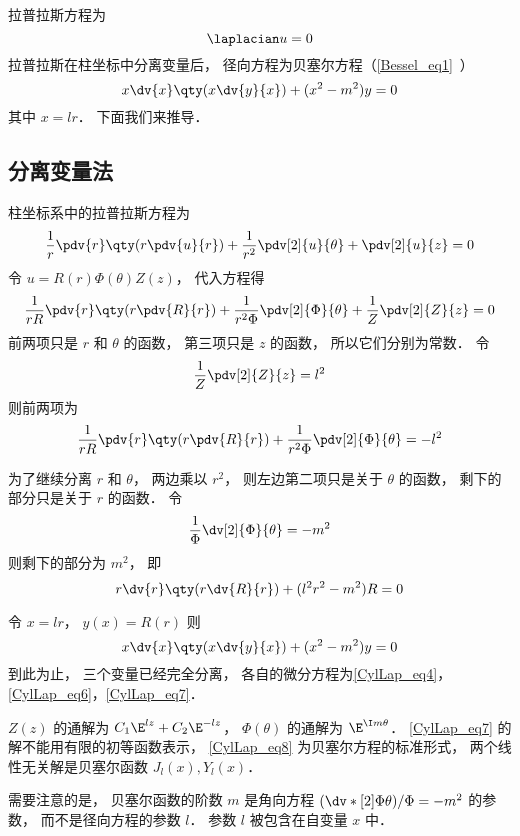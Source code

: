 

拉普拉斯方程为
\begin{equation}
\laplacian u = 0
\end{equation}
拉普拉斯在柱坐标中分离变量后， 径向方程为贝塞尔方程（\autoref{Bessel_eq1}~）
\begin{equation}
x \dv{x} \qty(x \dv{y}{x}) + (x^2 - m^2)y = 0
\end{equation}
其中 $x = lr$． 下面我们来推导．

\subsection{分离变量法}
柱坐标系中的拉普拉斯方程为
\begin{equation}
\frac{1}{r} \pdv{r} \qty(r\pdv{u}{r}) + \frac{1}{r^2} \pdv[2]{u}{\theta} + \pdv[2]{u}{z} = 0
\end{equation}
令 $u = R(r) \Phi(\theta) Z(z)$， 代入方程得
\begin{equation}
\frac{1}{rR}\pdv{r} \qty(r\pdv{R}{r}) + \frac{1}{r^2 \Phi} \pdv[2]{\Phi}{\theta} + \frac{1}{Z} \pdv[2]{Z}{z} = 0
\end{equation}
前两项只是 $r$ 和 $\theta $ 的函数， 第三项只是 $z$ 的函数， 所以它们分别为常数． 令
\begin{equation}\label{CylLap_eq4}
\frac{1}{Z} \pdv[2]{Z}{z} = l^2
\end{equation}
则前两项为
\begin{equation}
\frac{1}{rR} \pdv{r} \qty(r\pdv{R}{r}) + \frac{1}{r^2 \Phi} \pdv[2]{\Phi}{\theta} =  - l^2
\end{equation}

为了继续分离 $r$ 和 $\theta$， 两边乘以 $r^2$，   则左边第二项只是关于 $\theta$  的函数， 剩下的部分只是关于 $r$ 的函数． 令
\begin{equation}\label{CylLap_eq6}
\frac{1}{\Phi } \dv[2]{\Phi}{\theta} = -m^2
\end{equation}
则剩下的部分为 $m^2$， 即
\begin{equation}\label{CylLap_eq7}
r \dv{r} \qty(r\dv{R}{r}) + (l^2 r^2 - m^2)R = 0
\end{equation}

令 $x = lr$，   $y(x) = R(r)$ 则
\begin{equation}\label{CylLap_eq8} 
x \dv{x} \qty(x\dv{y}{x}) + (x^2 - m^2)y = 0
\end{equation}
到此为止， 三个变量已经完全分离， 各自的微分方程为\autoref{CylLap_eq4}， \autoref{CylLap_eq6}，\autoref{CylLap_eq7}．

$Z(z)$ 的通解为 $C_1\E^{lz} + C_2 \E^{-lz}$，   $\Phi(\theta)$ 的通解为 $\E^{\I m\theta}$．   \autoref{CylLap_eq7} 的解不能用有限的初等函数表示， \autoref{CylLap_eq8} 为贝塞尔方程的标准形式， 两个线性无关解是贝塞尔函数 $J_l(x), Y_l(x)$．

需要注意的是， 贝塞尔函数的阶数 $m$ 是角向方程 $(\dv*[2]{\Phi}{\theta})/\Phi = -m^2$ 的参数， 而不是径向方程的参数 $l$． 参数 $l$ 被包含在自变量 $x$ 中．
